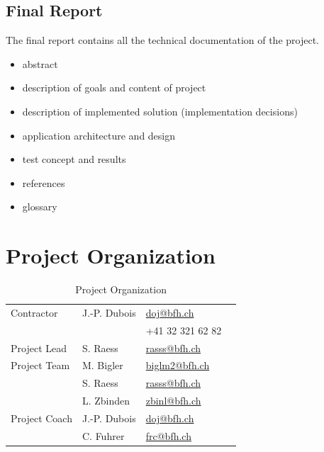 \documentclass[11pt,a4paper]{article}
\begin{document}
\subsection{Final Report}
The final report contains all the technical documentation of the project.
\begin{itemize}
 \item abstract
 \item description of goals and content of project
 \item description of implemented solution (implementation decisions)
 \item application architecture and design
 \item test concept and results
 \item references
 \item glossary
\end{itemize}


\section{Project Organization}

\begin{table}[H]
 \begin{center}
 \begin{tabular}{|l|l|l|l|}
 \hline
 Contractor             &  J.-P. Dubois     & \href{mailto:doj@bfh.ch}{doj@bfh.ch} \\
                        &                   &  +41 32 321 62 82 \\
 \hline
 Project Lead           &  S. Raess         & \href{mailto:rasss@bfh.ch}{rasss@bfh.ch} \\
 \hline
 Project Team           &  M. Bigler        & \href{mailto:biglm2@bfh.ch}{biglm2@bfh.ch} \\ 
                        &  S. Raess         & \href{mailto:rasss@bfh.ch}{rasss@bfh.ch} \\
                        &  L. Zbinden       & \href{mailto:zbinl@bfh.ch}{zbinl@bfh.ch} \\
 \hline
 Project Coach          &  J.-P. Dubois     & \href{mailto:doj@bfh.ch}{doj@bfh.ch} \\
                        &  C. Fuhrer        & \href{frc@bfh.ch}{frc@bfh.ch} \\
 \hline
 \end{tabular}
 \end{center}
 \caption{Project Organization}
 \label{table: Project Organization}
\end{table}
\end{document}

